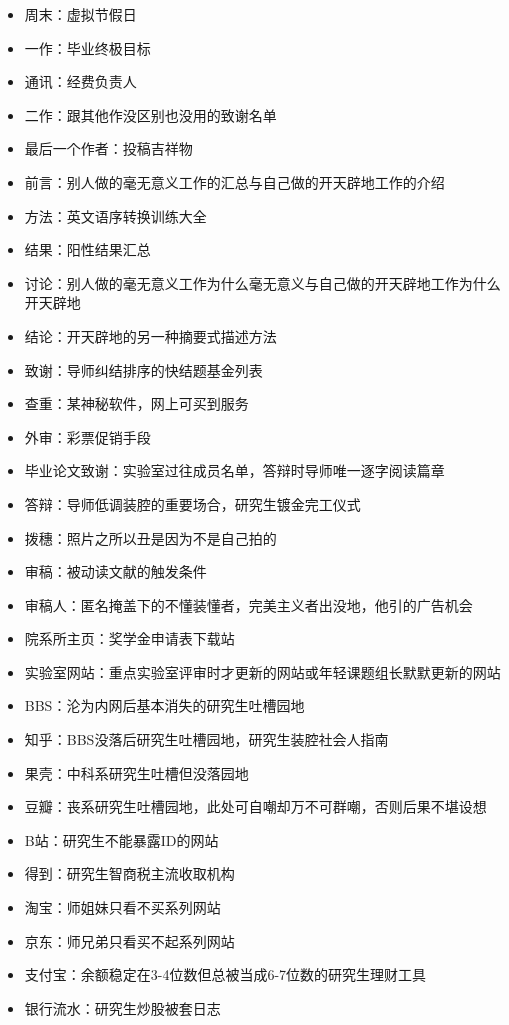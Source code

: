 \documentclass[]{tufte-book}
\begin{document}
\begin{itemize}
\item
  周末：虚拟节假日
\item
  一作：毕业终极目标
\item
  通讯：经费负责人
\item
  二作：跟其他作没区别也没用的致谢名单
\item
  最后一个作者：投稿吉祥物
\item
  前言：别人做的毫无意义工作的汇总与自己做的开天辟地工作的介绍
\item
  方法：英文语序转换训练大全
\item
  结果：阳性结果汇总
\item
  讨论：别人做的毫无意义工作为什么毫无意义与自己做的开天辟地工作为什么开天辟地
\item
  结论：开天辟地的另一种摘要式描述方法
\item
  致谢：导师纠结排序的快结题基金列表
\item
  查重：某神秘软件，网上可买到服务
\item
  外审：彩票促销手段
\item
  毕业论文致谢：实验室过往成员名单，答辩时导师唯一逐字阅读篇章
\item
  答辩：导师低调装腔的重要场合，研究生镀金完工仪式
\item
  拨穗：照片之所以丑是因为不是自己拍的
\item
  审稿：被动读文献的触发条件
\item
  审稿人：匿名掩盖下的不懂装懂者，完美主义者出没地，他引的广告机会
\item
  院系所主页：奖学金申请表下载站
\item
  实验室网站：重点实验室评审时才更新的网站或年轻课题组长默默更新的网站
\item
  BBS：沦为内网后基本消失的研究生吐槽园地
\item
  知乎：BBS没落后研究生吐槽园地，研究生装腔社会人指南
\item
  果壳：中科系研究生吐槽但没落园地
\item
  豆瓣：丧系研究生吐槽园地，此处可自嘲却万不可群嘲，否则后果不堪设想
\item
  B站：研究生不能暴露ID的网站
\item
  得到：研究生智商税主流收取机构
\item
  淘宝：师姐妹只看不买系列网站
\item
  京东：师兄弟只看买不起系列网站
\item
  支付宝：余额稳定在3-4位数但总被当成6-7位数的研究生理财工具
\item
  银行流水：研究生炒股被套日志

\end{itemize}
\end{document}
